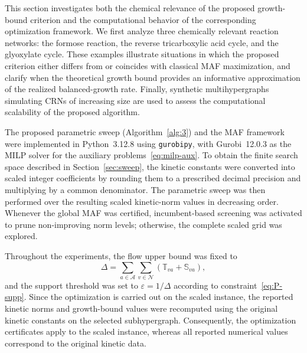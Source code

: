 \documentclass[a4paper,11pt,reqno]{amsart}
\begin{document}

This section investigates both the chemical relevance of the proposed
growth-bound criterion and the computational behavior of the corresponding
optimization framework. We first analyze three chemically relevant reaction
networks: the formose reaction, the reverse tricarboxylic acid cycle, and the
glyoxylate cycle. These examples illustrate situations in which the proposed
criterion either differs from or coincides with classical MAF maximization,
and clarify when the theoretical growth bound provides an informative
approximation of the realized balanced-growth rate. Finally, synthetic
multihypergraphs simulating CRNs of increasing size are used to assess the
computational scalability of the proposed algorithm.


The proposed parametric sweep (Algorithm~\ref{alg:3}) and the MAF
framework~\citep{gonzalez2024maf} were implemented in Python~3.12.8 using
\texttt{gurobipy}, with Gurobi~12.0.3 as the MILP solver for the auxiliary
problems~\eqref{eq:milp-aux}. To obtain the finite search space described in
Section~\ref{sec:sweep}, the kinetic constants were converted into scaled integer
coefficients by rounding them to a prescribed decimal precision and
multiplying by a common denominator. The parametric sweep was then performed
over the resulting scaled kinetic-norm values in decreasing order. Whenever
the global MAF was certified, incumbent-based screening was activated to prune
non-improving norm levels; otherwise, the complete scaled grid was explored.

Throughout the experiments, the flow upper bound was fixed to
$$
\Delta=
\sum_{a\in\mathcal A}\sum_{v\in\mathcal N}
(\mathbb T_{va}+\mathbb S_{va}),
$$
and the support threshold was set to
$\varepsilon=1/\Delta$ according to
constraint~\eqref{eq:P-supp}. Since the optimization is carried out on the
scaled instance, the reported kinetic norms and growth-bound values were
recomputed using the original kinetic constants on the selected
subhypergraph. Consequently, the optimization certificates apply to the scaled
instance, whereas all reported numerical values correspond to the original
kinetic data.
\end{document}
